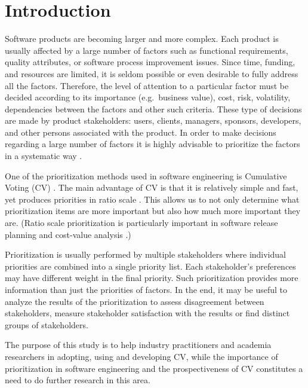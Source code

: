 \section{\label{intro}Introduction}

Software products are becoming larger and more complex. Each product
is usually affected by a large number of factors such as functional
requirements, quality attributes, or software process improvement
issues. Since time, funding, and resources are limited, it is seldom
possible or even desirable to fully address all the factors. Therefore,
the level of attention to a particular factor must be decided according
to its importance (e.g.\ business value), cost, risk, volatility, 
dependencies between the factors and other such criteria. 
These type of decisions are made by product stakeholders:
users, clients, managers, sponsors, developers, and other persons
associated with the product. In order to make decisions regarding a
large number of factors it is highly advisable to prioritize the factors
in a systematic way \cite{Berander2005}.

One of the prioritization methods used in software engineering is Cumulative Voting (CV) \cite{Leffingwell1999}.
The main advantage of CV is that it is relatively simple and fast, yet produces priorities in ratio scale \cite{Berander2005,Ahl2005}.
This allows us to not only determine what prioritization items are more important but also how much more important they are.
(Ratio scale prioritization is particularly important in software release planning and cost-value analysis \cite{Berander2006a, Karlsson1997}.)

Prioritization is usually performed by multiple stakeholders where individual priorities are combined into a single priority list.
Each stakeholder's preferences may have different weight in the final priority.
Such prioritization provides more information than just the priorities of factors.
In the end, it may be useful to analyze the results of the prioritization to assess disagreement between stakeholders, measure stakeholder satisfaction with the results or find distinct groups of stakeholders.

The purpose of this study is to help industry practitioners and academia researchers in adopting, using and developing CV, while the importance of prioritization in software engineering and the prospectiveness of CV constitutes a need to do further research in this area.

